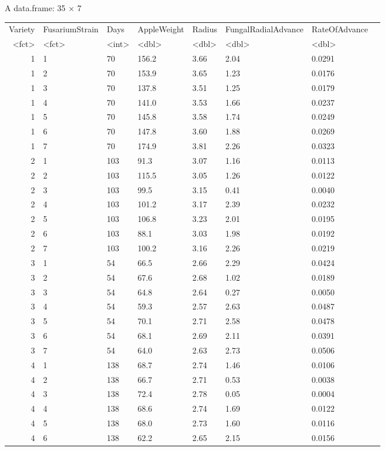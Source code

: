 \documentclass[11pt]{article}
\begin{document}
    A data.frame: 35 × 7
\begin{tabular}{r|lllllll}
 Variety & FusariumStrain & Days & AppleWeight & Radius & FungalRadialAdvance & RateOfAdvance\\
 <fct> & <fct> & <int> & <dbl> & <dbl> & <dbl> & <dbl>\\
\hline
	 1 & 1 &  70 & 156.2 & 3.66 & 2.04 & 0.0291\\
	 1 & 2 &  70 & 153.9 & 3.65 & 1.23 & 0.0176\\
	 1 & 3 &  70 & 137.8 & 3.51 & 1.25 & 0.0179\\
	 1 & 4 &  70 & 141.0 & 3.53 & 1.66 & 0.0237\\
	 1 & 5 &  70 & 145.8 & 3.58 & 1.74 & 0.0249\\
	 1 & 6 &  70 & 147.8 & 3.60 & 1.88 & 0.0269\\
	 1 & 7 &  70 & 174.9 & 3.81 & 2.26 & 0.0323\\
	 2 & 1 & 103 &  91.3 & 3.07 & 1.16 & 0.0113\\
	 2 & 2 & 103 & 115.5 & 3.05 & 1.26 & 0.0122\\
	 2 & 3 & 103 &  99.5 & 3.15 & 0.41 & 0.0040\\
	 2 & 4 & 103 & 101.2 & 3.17 & 2.39 & 0.0232\\
	 2 & 5 & 103 & 106.8 & 3.23 & 2.01 & 0.0195\\
	 2 & 6 & 103 &  88.1 & 3.03 & 1.98 & 0.0192\\
	 2 & 7 & 103 & 100.2 & 3.16 & 2.26 & 0.0219\\
	 3 & 1 &  54 &  66.5 & 2.66 & 2.29 & 0.0424\\
	 3 & 2 &  54 &  67.6 & 2.68 & 1.02 & 0.0189\\
	 3 & 3 &  54 &  64.8 & 2.64 & 0.27 & 0.0050\\
	 3 & 4 &  54 &  59.3 & 2.57 & 2.63 & 0.0487\\
	 3 & 5 &  54 &  70.1 & 2.71 & 2.58 & 0.0478\\
	 3 & 6 &  54 &  68.1 & 2.69 & 2.11 & 0.0391\\
	 3 & 7 &  54 &  64.0 & 2.63 & 2.73 & 0.0506\\
	 4 & 1 & 138 &  68.7 & 2.74 & 1.46 & 0.0106\\
	 4 & 2 & 138 &  66.7 & 2.71 & 0.53 & 0.0038\\
	 4 & 3 & 138 &  72.4 & 2.78 & 0.05 & 0.0004\\
	 4 & 4 & 138 &  68.6 & 2.74 & 1.69 & 0.0122\\
	 4 & 5 & 138 &  68.0 & 2.73 & 1.60 & 0.0116\\
	 4 & 6 & 138 &  62.2 & 2.65 & 2.15 & 0.0156\\

\end{tabular}
\end{document}
